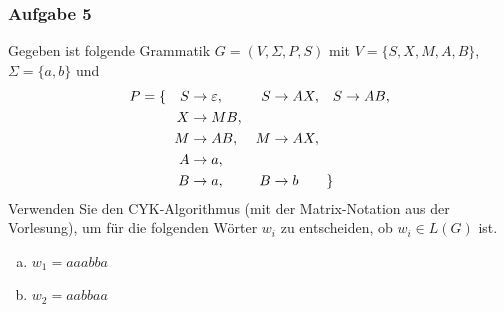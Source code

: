\documentclass{beamer}
\begin{document}
	\begin{frame} \frametitle{Aufgabe 5}
		\small
		Gegeben ist folgende Grammatik $G=(V,\Sigma,P,S)$ mit 
		$V=\{S,X,M,A,B\}$, $\Sigma=\{a,b\}$ und
		\begin{align*}
			P = \{ \quad S &\to \varepsilon, & S &\to AX, & S &\to AB, \\
			X &\to MB, \\
			M &\to AB, & M &\to AX, \\
			A &\to a, \\
			B &\to a, & B &\to b \rlap{\qquad \}} 
		\end{align*}
		Verwenden Sie den CYK-Algorithmus (mit der Matrix-Notation aus der
		Vorlesung), um für die folgenden Wörter $w_i$ zu entscheiden, ob
		$w_i\in L(G)$ ist. 
		
		\begin{enumerate}[a)]
			\item $w_1 = aaabba$
			\item $w_2 = aabbaa$
		\end{enumerate}    
	\end{frame}
\end{document}
